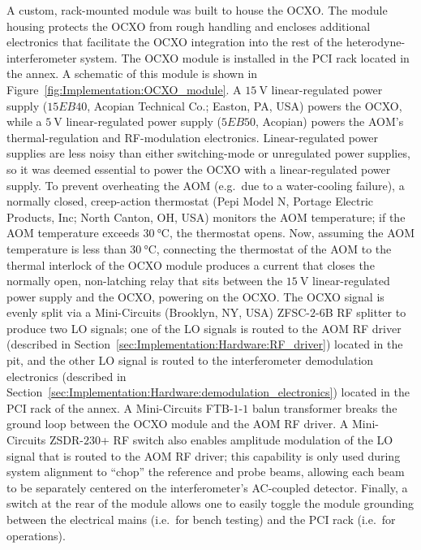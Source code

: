 A custom, rack-mounted module was built to house the OCXO.
The module housing protects the OCXO from rough handling and
encloses additional electronics that facilitate
the OCXO integration into the rest of the heterodyne-interferometer system.
The OCXO module is installed in the PCI rack
located in the \diiid\space annex.
A schematic of this module is shown in
Figure~\ref{fig:Implementation:OCXO_module}.
A $\SI{15}{\volt}$ linear-regulated power supply
($15EB40$, Acopian Technical Co.; Easton, PA, USA)
powers the OCXO, while
a $\SI{5}{\volt}$ linear-regulated power supply ($5EB50$, Acopian)
powers the AOM's thermal-regulation and RF-modulation electronics.
Linear-regulated power supplies are less noisy than
either switching-mode or unregulated power supplies, so
it was deemed essential to power the OCXO
with a linear-regulated power supply.
To prevent overheating the AOM
(e.g.\ due to a water-cooling failure),
a normally closed, creep-action thermostat
(Pepi Model N, Portage Electric Products, Inc; North Canton, OH, USA)
monitors the AOM temperature;
if the AOM temperature exceeds $\SI{30}{\celsius}$,
the thermostat opens.
Now, assuming the AOM temperature is less than $\SI{30}{\celsius}$,
connecting the thermostat of the AOM
to the thermal interlock of the OCXO module
produces a current that closes the normally open, non-latching relay
that sits between the $\SI{15}{\volt}$ linear-regulated power supply
and the OCXO, powering on the OCXO.
The OCXO signal is evenly split via
a Mini-Circuits (Brooklyn, NY, USA) {ZFSC-$2$-$6$B} RF splitter
to produce two LO signals;
one of the LO signals is routed to the AOM RF driver
(described in Section~\ref{sec:Implementation:Hardware:RF_driver})
located in the \diiid\space pit, and
the other LO signal is routed to the interferometer demodulation electronics
(described in
Section~\ref{sec:Implementation:Hardware:demodulation_electronics})
located in the PCI rack of the \diiid\space annex.
A Mini-Circuits {FTB-$1$-$1$} balun transformer
breaks the ground loop between the OCXO module and the AOM RF driver.
A Mini-Circuits {ZSDR-$230$+} RF switch also enables amplitude modulation
of the LO signal that is routed to the AOM RF driver;
this capability is only used during system alignment
to ``chop'' the reference and probe beams,
allowing each beam to be separately centered
on the interferometer's AC-coupled detector.
Finally, a switch at the rear of the module
allows one to easily toggle the module grounding between
the electrical mains (i.e.\ for bench testing) and
the PCI rack (i.e.\ for operations).


